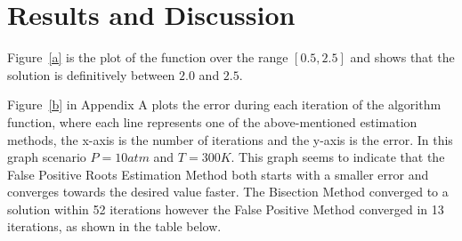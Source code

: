 \documentclass[12pt, letterpaper]{article}
\begin{document}
\section{Results and Discussion}
	Figure~\ref{a} is the plot of the function over the range $[0.5, 2.5]$ and shows that the solution is definitively between $2.0$ and $2.5$.

	Figure~\ref{b} in Appendix A plots the error during each iteration of the algorithm function, where each line represents one of the above-mentioned estimation methods, the x-axis is the number of iterations and the y-axis is the error. In this graph scenario $P=10atm$ and $T=300K$. This graph seems to indicate that the False Positive Roots Estimation Method both starts with a smaller error and converges towards the desired value faster. The Bisection Method converged to a solution within 52 iterations however the False Positive Method converged in 13 iterations, as shown in the table below.
\end{document}
